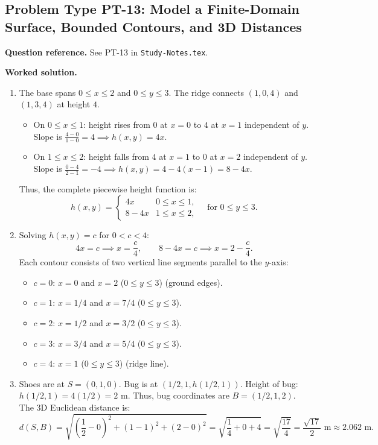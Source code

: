 \documentclass[11pt,letterpaper]{article}
\begin{document}
\subsection{Problem Type PT-13: Model a Finite-Domain Surface, Bounded Contours, and 3D Distances}
\textbf{Question reference.} See PT-13 in \texttt{Study-Notes.tex}.

\textbf{Worked solution.}
\begin{enumerate}[label=(\alph*),leftmargin=*]
    \item The base spans $0 \le x \le 2$ and $0 \le y \le 3$. The ridge connects $(1,0,4)$ and $(1,3,4)$ at height $4$.
    \begin{itemize}[nosep]
        \item On $0 \le x \le 1$: height rises from $0$ at $x=0$ to $4$ at $x=1$ independent of $y$. Slope is $\frac{4-0}{1-0} = 4 \implies h(x,y) = 4x$.
        \item On $1 \le x \le 2$: height falls from $4$ at $x=1$ to $0$ at $x=2$ independent of $y$. Slope is $\frac{0-4}{2-1} = -4 \implies h(x,y) = 4 - 4(x-1) = 8 - 4x$.
    \end{itemize}
    Thus, the complete piecewise height function is:
    \[ h(x,y) = \begin{cases} 4x & 0 \le x \le 1, \\ 8 - 4x & 1 \le x \le 2, \end{cases} \quad \text{for } 0 \le y \le 3. \]
    \item Solving $h(x,y) = c$ for $0 < c < 4$:
    \[ 4x = c \implies x = \frac{c}{4}, \qquad 8 - 4x = c \implies x = 2 - \frac{c}{4}. \]
    Each contour consists of two vertical line segments parallel to the $y$-axis:
    \begin{itemize}[nosep]
        \item $c = 0$: $x = 0$ and $x = 2$ ($0 \le y \le 3$) (ground edges).
        \item $c = 1$: $x = 1/4$ and $x = 7/4$ ($0 \le y \le 3$).
        \item $c = 2$: $x = 1/2$ and $x = 3/2$ ($0 \le y \le 3$).
        \item $c = 3$: $x = 3/4$ and $x = 5/4$ ($0 \le y \le 3$).
        \item $c = 4$: $x = 1$ ($0 \le y \le 3$) (ridge line).
    \end{itemize}
    \item Shoes are at $S = (0, 1, 0)$. Bug is at $(1/2, 1, h(1/2,1))$.
    Height of bug: $h(1/2, 1) = 4(1/2) = 2$ m. Thus, bug coordinates are $B = (1/2, 1, 2)$.
    The 3D Euclidean distance is:
    \[ d(S, B) = \sqrt{\left(\frac{1}{2} - 0\right)^2 + (1 - 1)^2 + (2 - 0)^2} = \sqrt{\frac{1}{4} + 0 + 4} = \sqrt{\frac{17}{4}} = \frac{\sqrt{17}}{2} \text{ m} \approx 2.062 \text{ m}. \]
\end{enumerate}
\end{document}
